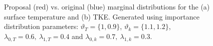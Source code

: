 \begin{figure}[H]%
    \centering
    \hspace*{-1.0em}%
    \caption[Proposal and target density functions used for importance sampling.]{Proposal (red) vs. original (blue) marginal distributions for the (a) surface temperature and (b) TKE.  Generated using importance distribution parameters: $\vartheta_T = \{1, 0.9\}$,  $\vartheta_k = \{1.1, 1.2\}$,  $\lambda_{0,T}=0.6,\ \lambda_{1,T}=0.4$ and $\lambda_{0,k}=0.7,\ \lambda_{1,k}=0.3$.}%
    \label{fig:imp_sample2}%
\end{figure}


